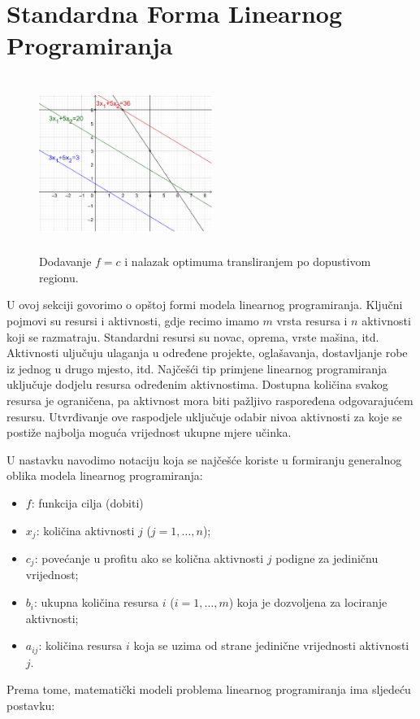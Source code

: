 \documentclass[a4paper, utf8, 11pt, colorlinks]{book}
\begin{document}
\section{Standardna Forma Linearnog Programiranja}

\begin{figure}[!ht]
    \centering
    \includegraphics[width=160pt, height=160pt]{fig2.eps}
    \caption{Dodavanje $f = c$ i nalazak optimuma transliranjem po dopustivom regionu.}
    \label{fig:fig2}
\end{figure}

U ovoj sekciji govorimo o opštoj formi modela linearnog programiranja. 
Ključni pojmovi su resursi i aktivnosti, gdje recimo imamo $m$ vrsta resursa i $n$ aktivnosti koji se razmatraju. Standardni resursi su novac, oprema, vrste mašina, itd. Aktivnosti uljučuju ulaganja u određene projekte, oglašavanja, dostavljanje robe iz jednog u drugo mjesto, itd. 
 Najčešći tip primjene linearnog programiranja uključuje dodjelu resursa određenim aktivnostima. Dostupna količina svakog resursa je ograničena, pa aktivnost mora biti pažljivo raspoređena odgovarajućem resursu.  Utvrđivanje ove raspodjele uključuje odabir nivoa aktivnosti za koje se postiže
najbolja moguća vrijednost ukupne mjere učinka. 

U nastavku navodimo notaciju koja se najčešće koriste u formiranju generalnog oblika modela linearnog programiranja:

\begin{itemize}
    \item $f$: funkcija cilja (dobiti) 
    \item $x_j$: količina aktivnosti $j$ ($j = 1,\ldots,n$);
    \item $c_j$: povećanje u profitu ako se količna aktivnosti $j$ podigne za jediničnu vrijednost;
    \item $b_i$: ukupna količina resursa $i$ ($i=1,\ldots,m$) koja je dozvoljena za lociranje aktivnosti;
    \item $a_{ij}$: količina resursa $i$ koja se uzima od strane jedinične vrijednosti aktivnosti $j$.
\end{itemize}
Prema tome, matematički modeli problema linearnog programiranja ima sljedeću postavku:
\end{document}

